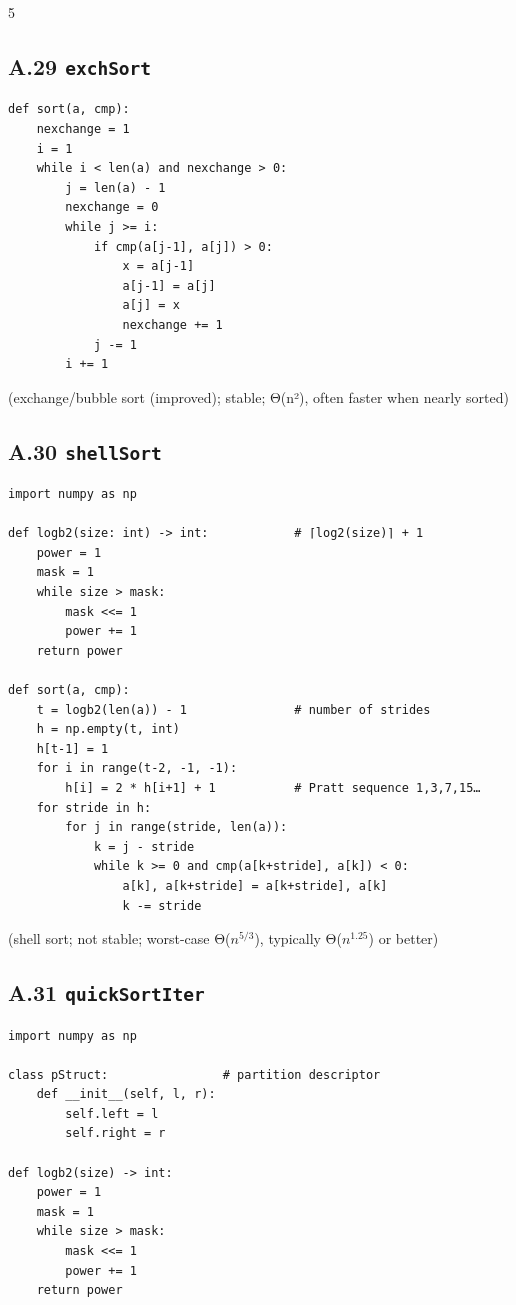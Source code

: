 \documentclass[6pt,landscape]{article}
\begin{document}
\begin{multicols}{5}
\subsection{A.29 \texttt{exchSort}}\label{code:A29}
\begin{verbatim}
def sort(a, cmp):
    nexchange = 1
    i = 1
    while i < len(a) and nexchange > 0:
        j = len(a) - 1
        nexchange = 0
        while j >= i:
            if cmp(a[j-1], a[j]) > 0:
                x = a[j-1]
                a[j-1] = a[j]
                a[j] = x
                nexchange += 1
            j -= 1
        i += 1
\end{verbatim}
(exchange/bubble sort (improved); stable; Θ(n²), often faster when nearly sorted)

\subsection{A.30 \texttt{shellSort}}\label{code:A30}
\begin{verbatim}
import numpy as np

def logb2(size: int) -> int:            # ⌈log2(size)⌉ + 1
    power = 1
    mask = 1
    while size > mask:
        mask <<= 1
        power += 1
    return power

def sort(a, cmp):
    t = logb2(len(a)) - 1               # number of strides
    h = np.empty(t, int)
    h[t-1] = 1
    for i in range(t-2, -1, -1):
        h[i] = 2 * h[i+1] + 1           # Pratt sequence 1,3,7,15…
    for stride in h:
        for j in range(stride, len(a)):
            k = j - stride
            while k >= 0 and cmp(a[k+stride], a[k]) < 0:
                a[k], a[k+stride] = a[k+stride], a[k]
                k -= stride
\end{verbatim}
(shell sort; not stable; worst-case Θ($n^{5/3}$), typically Θ($n^{1.25}$) or better)

\subsection{A.31 \texttt{quickSortIter}}\label{code:A31}
\begin{verbatim}
import numpy as np

class pStruct:                # partition descriptor
    def __init__(self, l, r):
        self.left = l
        self.right = r

def logb2(size) -> int:
    power = 1
    mask = 1
    while size > mask:
        mask <<= 1
        power += 1
    return power


\end{verbatim}
\end{multicols}
\end{document}
